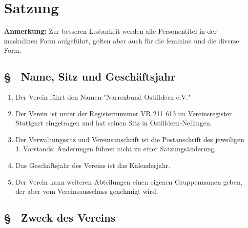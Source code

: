 \setcounter{saparagraphcounter}{1}

\section{Satzung}

\noindent\textbf{Anmerkung:} Zur besseren Lesbarkeit werden alle Personentitel in der maskulinen Form aufgeführt, gelten aber auch für die feminine und die diverse Form.

\subsection{§ \thesaparagraphcounter\ Name, Sitz und Geschäftsjahr} \label{sa:par:name_sitz_geschaeftsjahr}

\begin{enumerate}
    \item \label{sa:abs:65uuqj} Der Verein führt den Namen "Narrenbund Ostfildern e.V."
    
    \item \label{sa:abs:pizmw9} Der Verein ist unter der Registernummer VR 211 613 im Vereinsregister Stuttgart eingetragen und hat seinen Sitz in Ostfildern-Nellingen.
    
    \item \label{sa:abs:bda106} Der Verwaltungssitz und Vereinsanschrift ist die Postanschrift des jeweiligen 1. Vorstands; Änderungen führen nicht zu einer Satzungsänderung.
    
    \item \label{sa:abs:mqeodl} Das Geschäftsjahr des Vereins ist das Kalenderjahr.
    
    \item \label{sa:abs:yrxayp} Der Verein kann weiteren Abteilungen einen eigenen Gruppennamen geben, der aber vom Vereinsausschuss genehmigt wird.
\end{enumerate}

\subsection{§ \thesaparagraphcounter\ Zweck des Vereins} \label{sa:par:zweck_verein}

